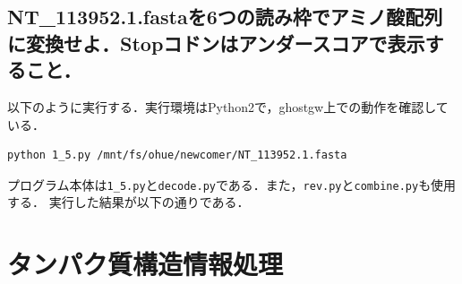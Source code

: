 \documentclass[uplatex,a4j]{jsarticle}
\begin{document}
  \subsection{NT\_113952.1.fastaを6つの読み枠でアミノ酸配列に変換せよ．Stopコドンはアンダースコアで表示すること．}
  以下のように実行する．実行環境はPython2で，ghostgw上での動作を確認している．
  \begin{lstlisting}[caption=実行方法, label=run5]
    python 1_5.py /mnt/fs/ohue/newcomer/NT_113952.1.fasta
  \end{lstlisting}
  プログラム本体は{\tt 1\_5.py}と{\tt decode.py}である．また，{\tt rev.py}と{\tt combine.py}も使用する．
  実行した結果が以下の通りである．
  
  
  \section{タンパク質構造情報処理}
\end{document}
